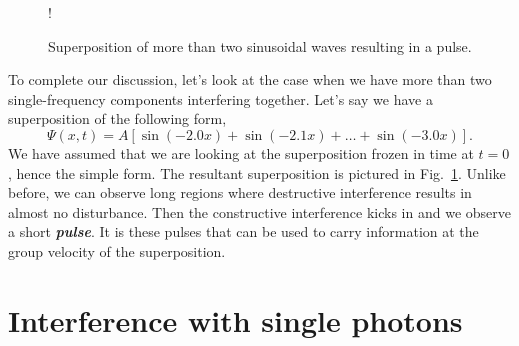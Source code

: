 \begin{figure}[t]
    \centering
    \resizebox {0.9\textwidth} {!} {
    }   
    \caption[Superposition of more than two waves.]{Superposition of more than two sinusoidal waves resulting in a pulse.}
    \label{fig:6-2_pulse}
\end{figure}
To complete our discussion, let's look at the case when we have more than two single-frequency components interfering together.
Let's say we have a superposition of the following form,
\begin{equation}
    \Psi(x,t) = A [\sin(-2.0x) + \sin(-2.1x) + \ldots + \sin(-3.0x)].
    \label{eq:6-2_pulse}
\end{equation}
We have assumed that we are looking at the superposition frozen in time at $t=0$, hence the simple form.
The resultant superposition is pictured in Fig.~\ref{fig:6-2_pulse}.
Unlike before, we can observe long regions where destructive interference results in almost no disturbance.
Then the constructive interference kicks in and we observe a short \textbf{\emph{pulse}}.
It is these pulses that can be used to carry information at the group velocity of the superposition.


\section{Interference with single photons}
\label{sec:6-3_interference_single_photons}

